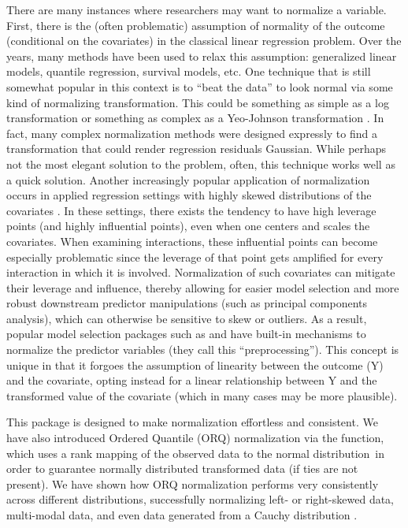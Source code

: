 There are many instances where researchers may want to normalize a
variable. First, there is the (often problematic) assumption of
normality of the outcome (conditional on the covariates) in the
classical linear regression problem. Over the years, many methods have
been used to relax this assumption: generalized linear models, quantile
regression, survival models, etc. One technique that is still somewhat
popular in this context is to ``beat the data'' to look normal via some
kind of normalizing transformation. This could be something as simple as
a log transformation or something as complex as a Yeo-Johnson
transformation \citep{yeojohnson}. In fact, many complex normalization
methods were designed expressly to find a transformation that could
render regression residuals Gaussian. While perhaps not the most elegant
solution to the problem, often, this technique works well as a quick
solution. Another increasingly popular application of normalization
occurs in applied regression settings with highly skewed distributions
of the covariates \citep{kuhn2013APM}. In these settings, there exists
the tendency to have high leverage points (and highly influential
points), even when one centers and scales the covariates. When examining
interactions, these influential points can become especially problematic
since the leverage of that point gets amplified for every interaction in
which it is involved. Normalization of such covariates can mitigate
their leverage and influence, thereby allowing for easier model
selection and more robust downstream predictor manipulations (such as
principal components analysis), which can otherwise be sensitive to skew
or outliers. As a result, popular model selection packages such as
 \citep{caret} and  \citep{recipes} have
built-in mechanisms to normalize the predictor variables (they call this
``preprocessing''). This concept is unique in that it forgoes the
assumption of linearity between the outcome (Y) and the covariate,
opting instead for a linear relationship between Y and the transformed
value of the covariate (which in many cases may be more plausible).

This package is designed to make normalization effortless and
consistent. We have also introduced Ordered Quantile (ORQ) normalization
via the  function, which uses a rank mapping of the
observed data to the normal distribution~in order to guarantee normally
distributed transformed data (if ties are not present). We have shown
how ORQ normalization performs very consistently across different
distributions, successfully normalizing left- or right-skewed data,
multi-modal data, and even data generated from a Cauchy distribution
\citep{orq_paper}.

